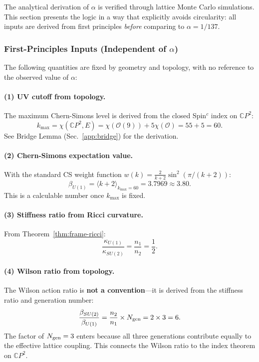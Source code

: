The analytical derivation of $\alpha$ is verified through lattice Monte Carlo simulations. This section presents the logic in a way that explicitly avoids circularity: all inputs are derived from first principles \textit{before} comparing to $\alpha = 1/137$.

\subsubsection{First-Principles Inputs (Independent of $\alpha$)}

The following quantities are fixed by geometry and topology, with no reference to the observed value of $\alpha$:

\paragraph{(1) UV cutoff from topology.}
The maximum Chern-Simons level is derived from the closed Spin$^c$ index on $\mathbb{C}P^2$:
\begin{equation}
k_{\max} = \chi(\mathbb{C}P^2, E) = \chi(\mathcal{O}(9)) + 5\chi(\mathcal{O}) = 55 + 5 = 60.
\end{equation}
See Bridge Lemma (Sec.~\ref{app:bridge}) for the derivation.

\paragraph{(2) Chern-Simons expectation value.}
With the standard CS weight function $w(k) = \frac{2}{k+2}\sin^2(\pi/(k+2))$:
\begin{equation}
\beta_{U(1)} = \langle k + 2 \rangle_{k_{\max}=60} = 3.7969 \approx 3.80.
\end{equation}
This is a calculable number once $k_{\max}$ is fixed.

\paragraph{(3) Stiffness ratio from Ricci curvature.}
From Theorem~\ref{thm:frame-ricci}:
\begin{equation}
\frac{\kappa_{U(1)}}{\kappa_{SU(2)}} = \frac{n_1}{n_2} = \frac{1}{2}.
\end{equation}

\paragraph{(4) Wilson ratio from topology.}
The Wilson action ratio is \textbf{not a convention}---it is derived from the stiffness ratio and generation number:
\begin{equation}
\frac{\beta_{SU(2)}}{\beta_{U(1)}} = \frac{n_2}{n_1} \times N_{\rm gen} = 2 \times 3 = 6.
\end{equation}
The factor of $N_{\rm gen} = 3$ enters because all three generations contribute equally to the effective lattice coupling. This connects the Wilson ratio to the index theorem on $\mathbb{C}P^2$.

